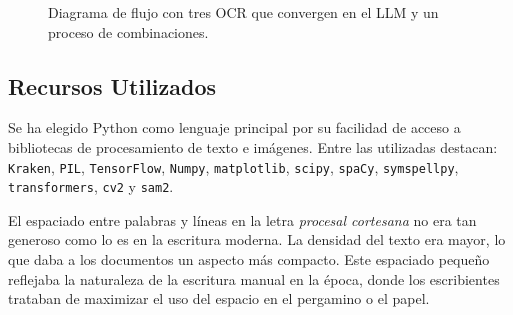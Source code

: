 \documentclass[11pt,a4paper]{article}
\begin{document}
\begin{figure}[h!]
    \centering
    \caption{Diagrama de flujo con tres OCR que convergen en el LLM y un proceso de combinaciones.}
    \label{fig:workflow}
\end{figure}

\subsection{Recursos Utilizados}

Se ha elegido Python como lenguaje principal por su facilidad de acceso a bibliotecas de procesamiento de texto e imágenes. Entre las utilizadas destacan: \texttt{Kraken}, \texttt{PIL}, \texttt{TensorFlow}, \texttt{Numpy}, \texttt{matplotlib}, \texttt{scipy}, \texttt{spaCy}, \texttt{symspellpy}, \texttt{transformers}, \texttt{cv2} y \texttt{sam2}.

El espaciado entre palabras y líneas en la letra \textit{procesal cortesana} no era tan generoso como lo es en la escritura moderna. La densidad del texto era mayor, lo que daba a los documentos un aspecto más compacto. Este espaciado pequeño reflejaba la naturaleza de la escritura manual en la época, donde los escribientes trataban de maximizar el uso del espacio en el pergamino o el papel.
\end{document}
